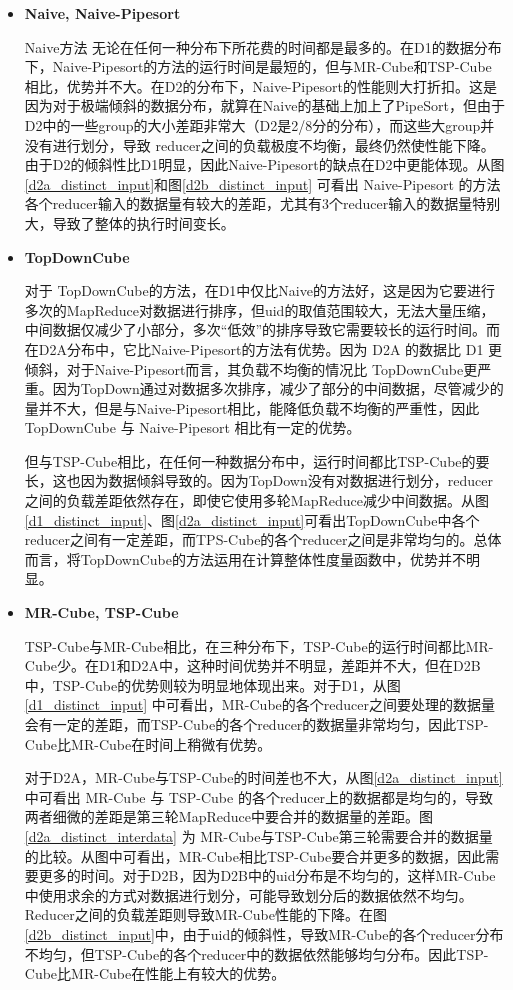 \begin{itemize}

\item \textbf{Naive, Naive-Pipesort}

Naive方法 无论在任何一种分布下所花费的时间都是最多的。在D1的数据分布下，Naive-Pipesort的方法的运行时间是最短的，但与MR-Cube和TSP-Cube相比，优势并不大。在D2的分布下，Naive-Pipesort的性能则大打折扣。这是因为对于极端倾斜的数据分布，就算在Naive的基础上加上了PipeSort，但由于D2中的一些group的大小差距非常大（D2是2/8分的分布），而这些大group并没有进行划分，导致 reducer之间的负载极度不均衡，最终仍然使性能下降。由于D2的倾斜性比D1明显，因此Naive-Pipesort的缺点在D2中更能体现。从图\ref{d2a_distinct_input}和图\ref{d2b_distinct_input} 可看出 Naive-Pipesort 的方法各个reducer输入的数据量有较大的差距，尤其有3个reducer输入的数据量特别大，导致了整体的执行时间变长。

\item \textbf{TopDownCube}

对于 TopDownCube的方法，在D1中仅比Naive的方法好，这是因为它要进行多次的MapReduce对数据进行排序，但uid的取值范围较大，无法大量压缩，中间数据仅减少了小部分，多次``低效”的排序导致它需要较长的运行时间。而在D2A分布中，它比Naive-Pipesort的方法有优势。因为 D2A 的数据比 D1 更倾斜，对于Naive-Pipesort而言，其负载不均衡的情况比 TopDownCube更严重。因为TopDown通过对数据多次排序，减少了部分的中间数据，尽管减少的量并不大，但是与Naive-Pipesort相比，能降低负载不均衡的严重性，因此TopDownCube 与 Naive-Pipesort 相比有一定的优势。

但与TSP-Cube相比，在任何一种数据分布中，运行时间都比TSP-Cube的要长，这也因为数据倾斜导致的。因为TopDown没有对数据进行划分，reducer之间的负载差距依然存在，即使它使用多轮MapReduce减少中间数据。从图\ref{d1_distinct_input}、图\ref{d2a_distinct_input}可看出TopDownCube中各个reducer之间有一定差距，而TPS-Cube的各个reducer之间是非常均匀的。总体而言，将TopDownCube的方法运用在计算整体性度量函数中，优势并不明显。

\item \textbf{MR-Cube, TSP-Cube}

TSP-Cube与MR-Cube相比，在三种分布下，TSP-Cube的运行时间都比MR-Cube少。在D1和D2A中，这种时间优势并不明显，差距并不大，但在D2B中，TSP-Cube的优势则较为明显地体现出来。对于D1，从图\ref{d1_distinct_input} 中可看出，MR-Cube的各个reducer之间要处理的数据量会有一定的差距，而TSP-Cube的各个reducer的数据量非常均匀，因此TSP-Cube比MR-Cube在时间上稍微有优势。

对于D2A，MR-Cube与TSP-Cube的时间差也不大，从图\ref{d2a_distinct_input}中可看出 MR-Cube 与 TSP-Cube 的各个reducer上的数据都是均匀的，导致两者细微的差距是第三轮MapReduce中要合并的数据量的差距。图\ref{d2a_distinct_interdata} 为 MR-Cube与TSP-Cube第三轮需要合并的数据量的比较。从图中可看出，MR-Cube相比TSP-Cube要合并更多的数据，因此需要更多的时间。对于D2B，因为D2B中的uid分布是不均匀的，这样MR-Cube中使用求余的方式对数据进行划分，可能导致划分后的数据依然不均匀。Reducer之间的负载差距则导致MR-Cube性能的下降。在图\ref{d2b_distinct_input}中，由于uid的倾斜性，导致MR-Cube的各个reducer分布不均匀，但TSP-Cube的各个reducer中的数据依然能够均匀分布。因此TSP-Cube比MR-Cube在性能上有较大的优势。

\end{itemize}

